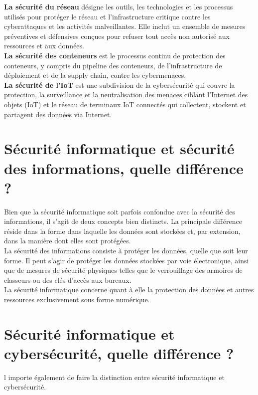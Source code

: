  \textbf{La sécurité du réseau }désigne les outils, les technologies et les processus utilisés pour protéger le réseau et l’infrastructure critique contre les cyberattaques et les activités malveillantes. Elle inclut un ensemble de mesures préventives et défensives conçues pour refuser tout accès non autorisé aux ressources et aux données.\\
 
 \textbf{La sécurité des conteneurs} est le processus continu de protection des conteneurs, y compris du pipeline des conteneurs, de l’infrastructure de déploiement et de la supply chain, contre les cybermenaces.\\
 
 \textbf{La sécurité de l’IoT} est une subdivision de la cybersécurité qui couvre la protection, la surveillance et la neutralisation des menaces ciblant l’Internet des objets (IoT) et le réseau de terminaux IoT connectés qui collectent, stockent et partagent des données via Internet.\\
 \section{Sécurité informatique et sécurité des informations, quelle différence ?}
 
 Bien que la sécurité informatique soit parfois confondue avec la sécurité des informations, il s’agit de deux concepts bien distincts. La principale différence réside dans la forme dans laquelle les données sont stockées et, par extension, dans la manière dont elles sont protégées.\\
 
 La sécurité des informations consiste à protéger les données, quelle que soit leur forme. Il peut s’agir de protéger les données stockées par voie électronique, ainsi que de mesures de sécurité physiques telles que le verrouillage des armoires de classeurs ou des clés d’accès aux bureaux.\\
 
 La sécurité informatique concerne quant à elle la protection des données et autres ressources exclusivement sous forme numérique.\\
 \section{Sécurité informatique et cybersécurité, quelle différence ?}
 l importe également de faire la distinction entre sécurité informatique et cybersécurité.\\
 
